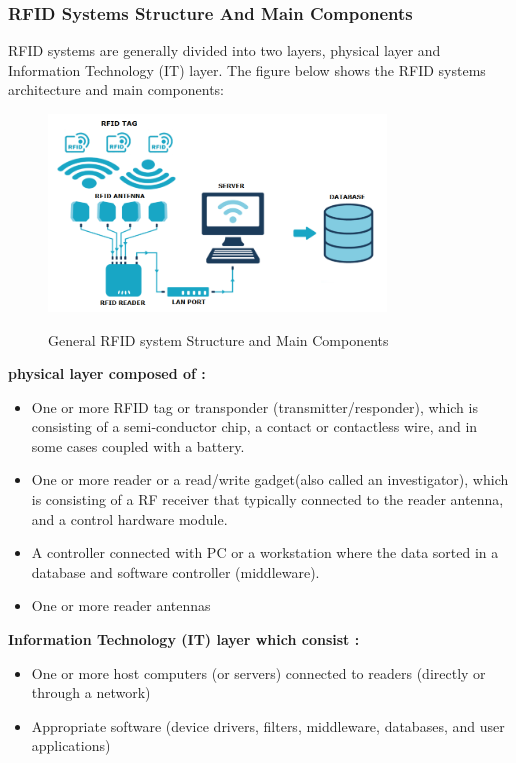 \subsubsection{RFID Systems Structure And Main Components}
RFID systems are generally divided into two layers, physical layer and Information Technology (IT) layer.
The figure below shows the RFID systems architecture and main components:\\
\begin{figure}[h]
	\centering
	\includegraphics[width=0.8\textwidth,height=0.3\textheight]{images chap1/rfidsys}
	\caption{General RFID system Structure and Main Components }\cite{rfidsys}
\end{figure}

\textbf{physical layer composed of :}
\begin{itemize}
	\item One or more RFID tag or transponder (transmitter/responder), which is consisting of a semi-conductor chip, a contact or contactless wire, and in some cases coupled with a battery.\\
	\item  One or more reader or a read/write gadget(also called an investigator), which is consisting of a RF receiver that typically connected to the reader antenna, and a control hardware module.\\
	\item  A controller connected with PC or a workstation where the data sorted in a database and software controller (middleware).
	\item One or more reader antennas
\end{itemize}
\textbf{Information Technology (IT) layer which consist :}
\begin{itemize}
	\item One or more host computers (or servers) connected to readers (directly or through a network)
	\item Appropriate software (device drivers, filters, middleware, databases, and user applications)
\end{itemize}

